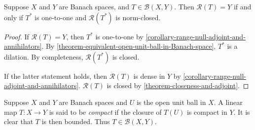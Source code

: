 \begin{theorem}
  Suppose \( X \) and \( Y \) are Banach spaces, and \( T \in \mathcal{B}(X, Y) \).
  Then \( \mathcal{R}(T) = Y \) if and only if \( T^* \) is one-to-one and \( \mathcal{R}(T^*) \) is norm-closed.
\end{theorem}
\begin{proof}
  If \( \mathcal{R}(T) = Y \), then \( T^* \) is one-to-one by \ref{corollary-range-null-adjoint-and-annihilators}.
  By \ref{theorem-equivalent-open-unit-ball-in-Banach-space}, \( T^* \) is a dilation.
  By completeness, \( \mathcal{R}(T^*) \) is closed. %

  If the latter statement holds, then \( \mathcal{R}(T) \) is dense in \( Y \) by \ref{corollary-range-null-adjoint-and-annihilators}.
  \( \mathcal{R}(T) \) is closed by \ref{theorem-closeness-and-adjoint}.
\end{proof}

\begin{definition}
  \label{definition-compact-linear-map}
  Suppose \( X \) and \( Y \) are Banach spaces and \( U \) is the open unit ball in \( X \).
  A linear map \( T: X \to Y \) is said to be \emph{compact} if the closure of \( T(U) \) is compact in \( Y \).
  It is clear that \( T \) is then bounded.
  Thus \( T \in \mathcal{B}(X, Y) \).
\end{definition}

